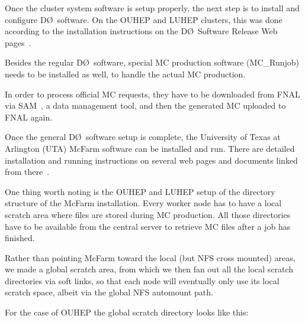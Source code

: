\documentclass{revtex4}
\newcommand{\DO}{\mbox{D\O}}
\begin{document}
Once the cluster system software is setup properly, the next step 
is to install and configure \DO\ software. On the OUHEP and LUHEP clusters, 
this was done according to the installation instructions on 
the \DO\ Software Release Web pages~\cite{utad0setup,d0soft}. 

Besides the regular \DO\ software, special MC production software 
(MC\_Runjob)~\cite{mcrunjob} needs to be installed as well, to handle 
the actual MC production.

In order to process official MC requests, they have to be downloaded 
from FNAL via SAM~\cite{sam}, a data management tool, 
and then the generated MC uploaded to FNAL again.

Once the general \DO\ software setup is complete, the University of Texas 
at Arlington (UTA) McFarm software can be installed and run. 
There are detailed installation and running instructions on several 
web pages and documents linked from there~\cite{mcfarm,utamcfarm}.

One thing worth noting is the OUHEP and LUHEP setup of the directory structure
of the McFarm installation. Every worker node has to have a local scratch 
area where files are stored during MC production. All those directories 
have to be available from the central server to retrieve MC files after
a job has finished.

Rather than pointing McFarm toward the local (but NFS cross mounted) 
areas, we made a global scratch area, from which we then fan out 
all the local scratch directories via soft links, so that each node
will eventually only use its local scratch space, albeit via the global
NFS automount path.

For the case of OUHEP the global scratch directory looks like this:
\end{document}
